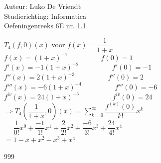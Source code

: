 \documentclass[a4paper]{article}
\begin{document}
\noindent \large Auteur: Luko De Vriendt\\
\noindent \large Studierichting: Informatica\\
\noindent \large Oefeningenreeks 6E nr. 1.1\\

\medskip

\normalsize

$T_4 (f,0)(x)$ voor $ f(x) = \dfrac{1}{1+x}$ \\

$f(x) = (1+x)^{-1} \hspace{2cm}  f(0) = 1$ \\

$f'(x) = -1(1+x)^{-2} \hspace{2cm}  f'(0) = -1$ \\

$f''(x) = 2(1+x)^{-3} \hspace{2cm}  f''(0) = 2$ \\

$f'''(x) = -6(1+x)^{-4} \hspace{2cm}  f'''(0) = -6$ \\

$f^{iv}(x) = 24(1+x)^{-5} \hspace{2cm}  f^{iv}(0) = 24$ \\

$\Rightarrow T_4\left (\dfrac{1}{1+x}, 0\right)(x) = \displaystyle \sum_{k=0}^{\infty} \dfrac{f^{(k)}(0)}{k!}x^k$ \\

$= \dfrac{1}{0!}x^0 + \dfrac{-1}{1!}x^1 + \dfrac{2}{2!}x^2 + \dfrac{-6}{3!}x^3 + \dfrac{24}{4!}x^4$ \\

$= 1 - x + x^2 - x^3 + x^4$ \\

\begin{thebibliography}{999}
\end{thebibliography}
\end{document}
